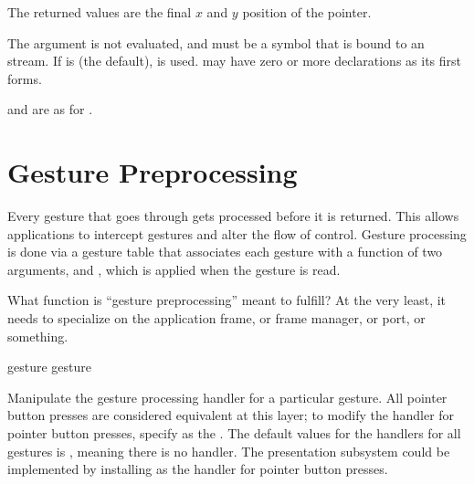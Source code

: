 The returned values are the final $x$ and $y$ position of the pointer.

The  argument is not evaluated, and must be a symbol that is bound
to an  stream.  If  is  (the
default),  is used.   may have zero or more
declarations as its first forms.

 and  are as for .


\section {Gesture Preprocessing\label{gesture-preproc}}

Every gesture that goes through  gets processed before
it is returned.  This allows applications to intercept gestures and alter the
flow of control.  Gesture processing is done via a gesture table that associates
each gesture with a function of two arguments,  and ,
which is applied when the gesture is read.

 {What function is ``gesture preprocessing'' meant to fulfill?
At the very least, it needs to specialize on the application frame, or frame
manager, or port, or something.}

 {gesture}
 {gesture}

Manipulate the gesture processing handler for a particular gesture.  All pointer
button presses are considered equivalent at this layer; to modify the handler
for pointer button presses, specify  as the
.  The default values for the handlers for all gestures is
, meaning there is no handler.  The presentation subsystem could be
implemented by installing  as the handler
for pointer button presses.
